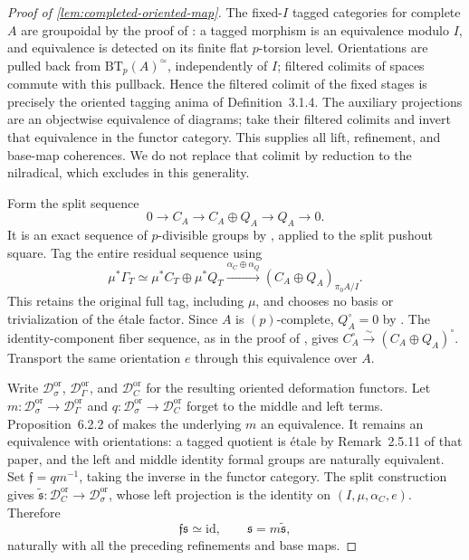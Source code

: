 \begin{proof}[Proof of \cref{lem:completed-oriented-map}]
The fixed-\(I\) tagged categories for complete \(A\) are groupoidal by
the proof of \cite[Lemma~3.1.10]{LurieEllipticII2018}: a tagged morphism
is an equivalence modulo \(I\), and equivalence is detected on its finite
flat \(p\)-torsion level. Orientations are pulled back from
\(\mathrm{BT}_p(A)^\simeq\), independently of \(I\); filtered colimits
of spaces commute with this pullback. Hence the filtered colimit of the
fixed stages is precisely the oriented tagging anima of
Definition~3.1.4. The auxiliary projections are an objectwise
equivalence of diagrams; take their filtered colimits and invert that
equivalence in the functor category. This supplies all lift, refinement,
and base-map coherences. We do not replace that colimit by reduction
to the nilradical, which \cite[Warning~3.1.9]{LurieEllipticII2018} excludes
in this generality.

Form the split sequence
\[
 0\longrightarrow C_A\longrightarrow C_A\oplus Q_A
 \longrightarrow Q_A\longrightarrow0.
\]
It is an exact sequence of \(p\)-divisible groups by
\cite[Proposition~2.4.8]{LurieEllipticII2018}, applied to the split pushout
square. Tag the entire residual sequence using
\[
 \mu^*\Gamma_T\simeq\mu^*C_T\oplus\mu^*Q_T
 \xrightarrow{\alpha_C\oplus\alpha_Q}
 (C_A\oplus Q_A)_{\pi_0A/I}.
\]
This retains the original full tag, including \(\mu\), and chooses no
basis or trivialization of the étale factor. Since \(A\) is
\((p)\)-complete, \(Q_A^\circ=0\) by
\cite[Proposition~2.5.8]{LurieEllipticII2018}. The identity-component fiber
sequence, as in the proof of
\cite[Proposition~2.5.17]{LurieEllipticII2018}, gives
\(C_A^\circ\xrightarrow{\sim}(C_A\oplus Q_A)^\circ\).
Transport the same orientation \(e\) through this equivalence over \(A\).

Write \(\mathscr D_\sigma^{\mathrm{or}}\),
\(\mathscr D_\Gamma^{\mathrm{or}}\), and
\(\mathscr D_C^{\mathrm{or}}\) for the resulting oriented deformation
functors. Let \(m:\mathscr D_\sigma^{\mathrm{or}}\to
\mathscr D_\Gamma^{\mathrm{or}}\) and
\(q:\mathscr D_\sigma^{\mathrm{or}}\to\mathscr D_C^{\mathrm{or}}\)
forget to the middle and left terms. Proposition~6.2.2 of
\cite{LurieEllipticII2018} makes the underlying \(m\) an equivalence.
It remains an equivalence with orientations: a tagged quotient is étale
by Remark~2.5.11 of that paper, and the left and middle identity formal
groups are naturally equivalent. Set \(\mathfrak f=qm^{-1}\), taking the
inverse in the functor category. The split construction gives
\(\widetilde{\mathfrak s}:\mathscr D_C^{\mathrm{or}}\to
\mathscr D_\sigma^{\mathrm{or}}\), whose left projection is the identity
on \((I,\mu,\alpha_C,e)\). Therefore
\[
 \mathfrak f\mathfrak s\simeq\mathrm{id},
 \qquad \mathfrak s=m\widetilde{\mathfrak s},
\]
naturally with all the preceding refinements and base maps.


\end{proof}
